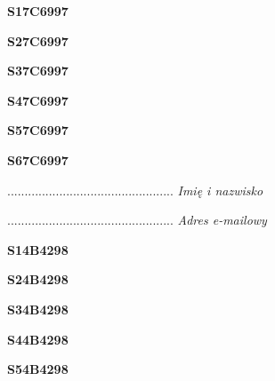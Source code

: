 \begin{turn}{90}\huge \textbf{S17C6997}\end{turn}

\begin{turn}{90}\huge \textbf{S27C6997}\end{turn}

\begin{turn}{90}\huge \textbf{S37C6997}\end{turn}

\begin{turn}{90}\huge \textbf{S47C6997}\end{turn}

\begin{turn}{90}\huge \textbf{S57C6997}\end{turn}

\begin{turn}{90}\huge \textbf{S67C6997}\end{turn}

\begin{turn}{90}\begin{minipage}{\linewidth} \vspace{20mm} ................................................  \textit{Imię i nazwisko}\end{minipage}\end{turn}

\begin{turn}{90}\begin{minipage}{\linewidth} \vspace{20mm} ................................................  \textit{Adres e-mailowy}\end{minipage}\end{turn}

\begin{turn}{90}\huge \textbf{S14B4298}\end{turn}

\begin{turn}{90}\huge \textbf{S24B4298}\end{turn}

\begin{turn}{90}\huge \textbf{S34B4298}\end{turn}

\begin{turn}{90}\huge \textbf{S44B4298}\end{turn}

\begin{turn}{90}\huge \textbf{S54B4298}\end{turn}

